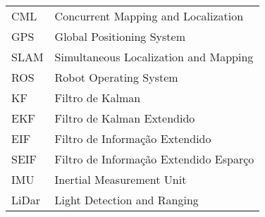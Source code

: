 \begin{longtable}{ll}
CML & Concurrent Mapping and Localization \\
GPS & Global Positioning System \\
SLAM & Simultaneous Localization and Mapping\\
ROS & Robot Operating System\\
KF & Filtro de Kalman\\
EKF & Filtro de Kalman Extendido\\
EIF & Filtro de Informação Extendido\\
SEIF & Filtro de Informação Extendido Esparço\\
IMU & Inertial Measurement Unit\\
LiDar & Light Detection and Ranging\\
\end{longtable}

